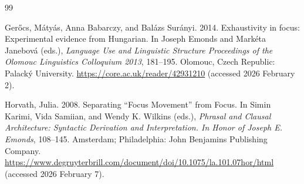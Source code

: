 \documentclass[a4paper, ruler]{CUP-JNL-LIN}%
\begin{document}
\begin{Backmatter}
\begin{thebibliography}{99}

{Gerőcs, Mátyás, Anna Babarczy, and Balázs Surányi}. 2014. Exhaustivity in focus: Experimental evidence from Hungarian. In Joseph Emonds and Markéta Janebová (eds.), \textit{Language Use and Linguistic Structure Proceedings of the Olomouc Linguistics Colloquium 2013}, 181--195. Olomouc, Czech Republic: Palacký University. \url{https://core.ac.uk/reader/42931210}  (accessed 2026 February 2).




{Horvath, Julia}. 2008. Separating “Focus Movement” from Focus. In Simin Karimi, Vida Samiian, and Wendy K. Wilkins (eds.), \textit{Phrasal and Clausal Architecture: Syntactic Derivation and Interpretation. In Honor of Joseph E. Emonds}, 108--145. Amsterdam; Philadelphia: John Benjamins Publishing Company. \url{https://www.degruyterbrill.com/document/doi/10.1075/la.101.07hor/html} (accessed 2026 February 7).



\end{thebibliography}
\end{Backmatter}
\end{document}
